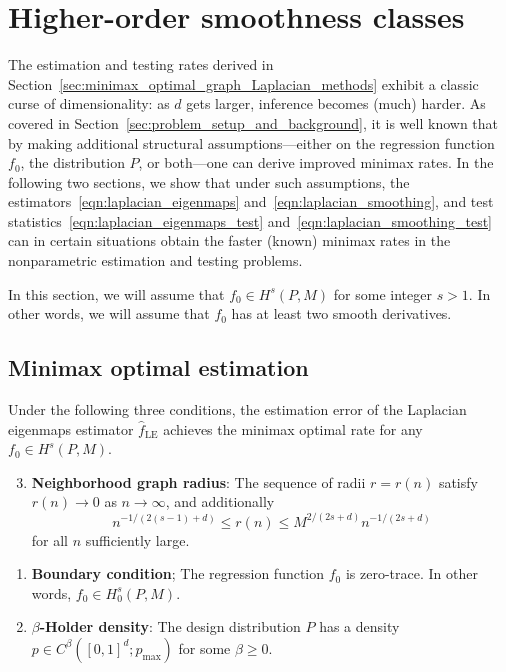 \documentclass{article}
\newcommand{\1}{\mathbf{1}}
\newcommand{\wh}[1]{\widehat{#1}}
\newcommand{\LE}{\mathrm{LE}}
\theoremstyle{alden}
\theoremstyle{aldenthm}
\theoremstyle{definition}
\theoremstyle{remark}
\begin{document}
\section{Higher-order smoothness classes}
\label{sec:higher_order_smoothness_classes}
The estimation and testing rates derived in Section~\ref{sec:minimax_optimal_graph_Laplacian_methods} exhibit a classic curse of dimensionality: as $d$ gets larger, inference becomes (much) harder. As covered in Section~\ref{sec:problem_setup_and_background}, it is well known that by making additional structural assumptions---either on the regression function $f_0$, the distribution $P$, or both---one can derive improved minimax rates. In the following two sections, we show that under such assumptions, the estimators~\eqref{eqn:laplacian_eigenmaps} and~\eqref{eqn:laplacian_smoothing}, and test statistics~\eqref{eqn:laplacian_eigenmaps_test} and~\eqref{eqn:laplacian_smoothing_test} can in certain situations obtain the faster (known) minimax rates in the nonparametric estimation and testing problems.

In this section, we will assume that $f_0 \in H^s(P,M)$ for some integer $s > 1$. In other words, we will assume that $f_0$ has at least two smooth derivatives. 

\subsection{Minimax optimal estimation}
\label{subsec:minimax_estimation_higher_order}
Under the following three conditions, the estimation error of the Laplacian eigenmaps estimator $\wh{f}_{\LE}$ achieves the minimax optimal rate for any $f_0 \in H^s(P,M)$.
\begin{enumerate}[label=(K\arabic*)]
	\setcounter{enumi}{2}
	\item 
	\label{asmp:kernel_radius_higher_order}
	\textbf{Neighborhood graph radius}:
	The sequence of radii $r = r(n)$ satisfy $r(n) \to 0$ as $n \to \infty$, and additionally
	\begin{equation*}
	n^{-1/(2(s - 1) + d)}\leq r(n) \leq M^{2/(2s + d)}n^{-1/(2s + d)}
	\end{equation*}
	for all $n$ sufficiently large.
\end{enumerate}
\begin{enumerate}[label=(F\arabic*)]
	\setcounter{enumi}{0}
	\item 
	\label{asmp:boundary} \textbf{Boundary condition}; The regression function $f_0$ is zero-trace. In other words, $f_0 \in H_0^s(P,M)$. 
\end{enumerate}
\begin{enumerate}[label=(P\arabic*)]
	\setcounter{enumi}{1}
	\item 
	\label{asmp:smooth_density}\textbf{$\beta$-Holder density}: The design distribution $P$ has a density $p \in C^{\beta}([0,1]^d;p_{\max})$ for some $\beta \geq 0$. 
\end{enumerate}
\end{document}
